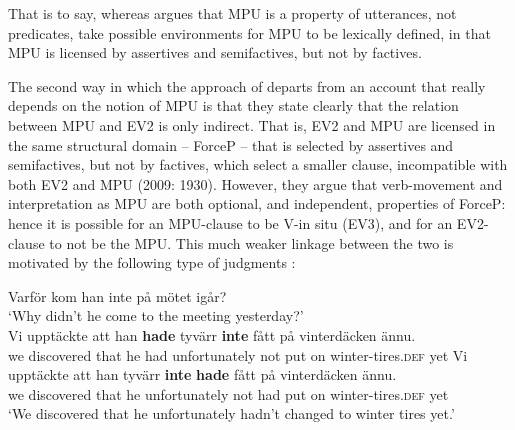 \documentclass[output=paper]{langsci/langscibook}
\begin{document}
That is to say, whereas \citeauthor{Simons2007} argues that MPU is a property of utterances, not predicates, \citeauthor{WiklundEtAl2009} take possible environments for MPU to be lexically defined, in that MPU is licensed by assertives and semifactives, but not by factives. 

The second way in which the approach of \citet{WiklundEtAl2009} departs from an account that really depends on the notion of MPU is that they state clearly that the relation between MPU and EV2 is only indirect. That is, EV2 and MPU are licensed in the same structural domain -- ForceP -- that is selected by assertives and semifactives, but not by factives, which select a smaller clause, incompatible with both EV2 and MPU (2009: 1930). However, they argue that verb-movement and interpretation as MPU are both optional, and independent, properties of ForceP: hence it is possible for an MPU-clause to be V-in situ (EV3), and for an EV2-clause to not be the MPU. This much weaker linkage between the two is motivated by the following type of judgments \citep[1927]{WiklundEtAl2009}:


\ea\label{ex:varforkom} 
	

	Varf\"or kom han inte p{\aa} m\"otet ig{\aa}r?\\
	`Why didn't he come to the meeting yesterday?'\\

	\ea  Vi uppt\"ackte att han \textbf{hade} tyv\"arr \textbf{inte} f{\aa}tt p{\aa} vinterd\"acken \"annu.\\ 
	 we discovered that he had unfortunately not put on winter-tires.\textsc{def} yet
	\ex  Vi uppt\"ackte att han tyv\"arr \textbf{inte} \textbf{hade} f{\aa}tt p{\aa} vinterd\"acken \"annu.\\ 
	we discovered that he unfortunately not had put on winter-tires.\textsc{def} yet \\
	 `We discovered that he unfortunately hadn't changed to winter tires yet.' \\
    \citep[1927]{WiklundEtAl2009}
    \z
\z
\end{document}
